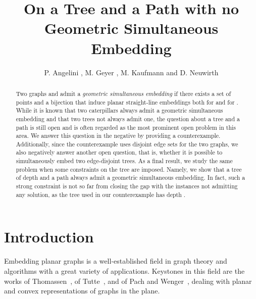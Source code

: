 \documentclass[a4paper,10pt]{llncs}
\begin{document}
\title{On a Tree and a Path with no Geometric Simultaneous Embedding}

\author{P. Angelini , M. Geyer ,  M. Kaufmann  and D. Neuwirth }




\maketitle              






\begin{abstract}
Two graphs  and  admit a \emph{geometric simultaneous embedding} if there exists a set of points  and a bijection  that induce planar straight-line embeddings both for  and for . While it is known that two caterpillars always admit a geometric simultaneous embedding and that two trees not always admit one, the question about a tree and a path is still open and is often regarded as the most prominent open problem in this area. We answer this question in the negative by providing a counterexample. Additionally, since the counterexample uses disjoint edge sets for the two graphs, we also negatively answer another open question, that is, whether it is possible to simultaneously embed two edge-disjoint trees. As a final result, we study the same problem when some constraints on the tree are imposed. Namely, we show that a tree of depth  and a path always admit a geometric simultaneous embedding. In fact, such a strong constraint is not so far from closing the gap with the instances not admitting any solution, as the tree used in our counterexample has depth .
\end{abstract}



\section{Introduction}

Embedding planar graphs is a well-established field in graph theory and algorithms with a great variety of applications. Keystones in this field are the works of Thomassen~\cite{t-eg-94}, of Tutte~\cite{t-hdg-63}, and of Pach and Wenger~\cite{pw-epgfvl-01}, dealing with planar and convex representations of graphs in the plane.
\end{document}
